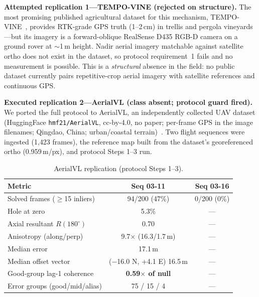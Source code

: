 \documentclass[journal]{IEEEtran}
\begin{document}
\textbf{Attempted replication 1---TEMPO-VINE (rejected on structure).} The most promising published agricultural dataset for this mechanism, TEMPO-VINE~\cite{tempovine}, provides RTK-grade GPS truth (1--2\,cm) in trellis and pergola vineyards---but its imagery is a forward-oblique RealSense D435 RGB-D camera on a ground rover at $\sim$1\,m height. Nadir aerial imagery matchable against satellite ortho does not exist in the dataset, so protocol requirement~1 fails and no measurement is possible. This is a \emph{structural} absence in the field: no public dataset currently pairs repetitive-crop aerial imagery with satellite references and continuous GPS.

\textbf{Executed replication 2---AerialVL (class absent; protocol guard fired).} We ported the full protocol to AerialVL, an independently collected UAV dataset (HuggingFace \texttt{hmf21/AerialVL}, cc-by-4.0, no paper; per-frame GPS in the image filenames; Qingdao, China; urban/coastal terrain)~\cite{aerialvl}. Two flight sequences were ingested (1{,}423 frames), the reference map built from the dataset's georeferenced ortho (0.959\,m/px), and protocol Steps 1--3 run.

\begin{table}[t]
\caption{AerialVL replication (protocol Steps 1--3).}
\label{tab:aerialvl}
\centering
\begin{tabular}{@{}lcc@{}}
\toprule
Metric & Seq 03-11 & Seq 03-16 \\
\midrule
Solved frames ($\geq$15 inliers) & 94/200 (47\%) & 0/200 (0\%) \\
Hole at zero & 5.3\% & --- \\
Axial resultant $R(180^{\circ})$ & 0.70 & --- \\
Anisotropy (along/perp) & 9.7$\times$ (16.3/1.7\,m) & --- \\
Median error & 17.1\,m & --- \\
Median offset vector & ($-$16.0 N, +4.1 E) 16.5\,m & --- \\
Good-group lag-1 coherence & \textbf{0.59$\times$ of null} & --- \\
Error groups (good/mid/alias) & 75 / 15 / 4 & --- \\
\bottomrule
\end{tabular}
\end{table}
\end{document}
